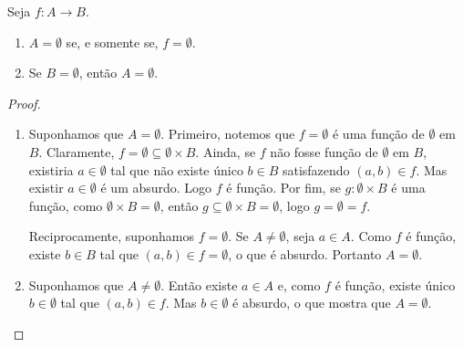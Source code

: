 \begin{prop}
	Seja $f: A \to B$.
	\begin{enumerate}
	\item $A=\emptyset$ se, e somente se, $f=\emptyset$.
	\item Se $B=\emptyset$, então $A=\emptyset$.
	\end{enumerate}
\end{prop}
\begin{proof}
	\begin{enumerate}
	\item Suponhamos que $A=\emptyset$. Primeiro, notemos que $f=\emptyset$ é uma função de $\emptyset$ em $B$. Claramente, $f = \emptyset \subseteq \emptyset \times B$. Ainda, se $f$ não fosse função de $\emptyset$ em $B$, existiria $a \in \emptyset$ tal que não existe único $b \in B$ satisfazendo $(a,b) \in f$. Mas existir $a \in \emptyset$ é um absurdo. Logo $f$ é função. Por fim, se $g: \emptyset \times B$ é uma função, como $\emptyset \times B = \emptyset$, então $g \subseteq \emptyset \times B = \emptyset$, logo $g=\emptyset=f$.
	
	Reciprocamente, suponhamos $f=\emptyset$. Se $A \neq \emptyset$, seja $a \in A$. Como $f$ é função, existe $b \in B$ tal que $(a,b) \in f=\emptyset$, o que é absurdo. Portanto $A=\emptyset$.
	
	\item Suponhamos que $A \neq \emptyset$. Então existe $a \in A$ e, como $f$ é função, existe único $b \in \emptyset$ tal que $(a,b) \in f$. Mas $b \in \emptyset$ é absurdo, o que mostra que $A = \emptyset$.
	\end{enumerate}
\end{proof}

